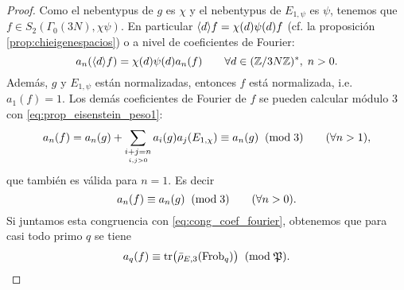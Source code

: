 \begin{proof}
    Como el nebentypus de $g$ es $\chi$ y el nebentypus de $E_{1,\psi}$ es $\psi$, tenemos que $f\in S_2(\Gamma_0(3N),\chi\psi)$. En particular $\langle d \rangle f=\chi(d)\psi(d)f$ (cf. la proposici\'on \ref{prop:chieigenespacios}) o a nivel de coeficientes de Fourier:
    \begin{equation}\label{eq:diamondf}
      a_n(\langle d \rangle f)=\chi(d)\psi(d)a_n(f)\qquad\forall d\in(\mathbb{Z}/3N\mathbb{Z})^*,\; n>0.
    \end{equation}
Además, $g$ y $E_{1,\psi}$ están normalizadas, entonces $f$ está normalizada, i.e. $a_1(f)=1$. Los dem\'as coeficientes de Fourier de $f$ se pueden calcular módulo 3 con \eqref{eq:prop_eisenstein_peso1}:
  \[
    a_n(f)=
    a_n(g)+\sum_{\underset{i,j>0}{i+j=n}}a_i(g)a_j(E_{1,\chi})\equiv
    a_n(g) \;\;(\mathrm{mod}\; 3)\qquad(\forall n>1),
  \]
que también es válida para $n=1$. Es decir
  \begin{equation}\label{eq:cong_coef_fourier_gE}
  	a_n(f)\equiv a_n(g) \;\;(\mathrm{mod}\; 3)\qquad(\forall n>0).
  \end{equation}
Si juntamos esta congruencia con \eqref{eq:cong_coef_fourier}, obtenemos que para casi todo primo $q$ se tiene
  \begin{equation}\label{eq:cong_coef_prod}
    a_q(f)\equiv\mathrm{tr}\big(\bar{\rho}_{E,3}(\mathrm{Frob}_q)\big) \;\;(\mathrm{mod}\; \mathfrak{P}).
  \end{equation}
  

\end{proof}
